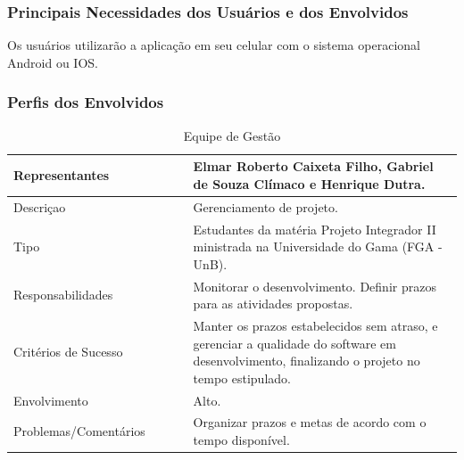 \begin{apendicesenv}
\subsubsection{Principais Necessidades dos Usuários e dos Envolvidos}

Os usuários utilizarão a aplicação em seu celular com o sistema operacional Android ou IOS.

\subsubsection{Perfis dos Envolvidos}


\begin{table}[htp]
    \centering
    \caption{Equipe de Gestão}
    \label{my-label}
    \begin{tabular}{|p{0.40\linewidth}|p{0.60\linewidth}|}
        \hline
        Representantes    & Elmar Roberto Caixeta Filho, Gabriel de Souza Clímaco e Henrique Dutra. \\ \hline
        Descriçao    & Gerenciamento de projeto. \\ \hline
        Tipo    & Estudantes da matéria Projeto Integrador II ministrada na Universidade do Gama (FGA - UnB). \\ \hline
        Responsabilidades    & Monitorar o desenvolvimento. Definir prazos para as atividades propostas. \\ \hline
        Critérios de Sucesso    & Manter os prazos estabelecidos sem atraso, e gerenciar a qualidade do software em desenvolvimento, finalizando o projeto no tempo estipulado. \\ \hline
        Envolvimento    & Alto. \\ \hline
        Problemas/Comentários    & Organizar prazos e metas de acordo com o tempo disponível. \\ \hline
    \end{tabular}
\end{table}



\end{apendicesenv}
